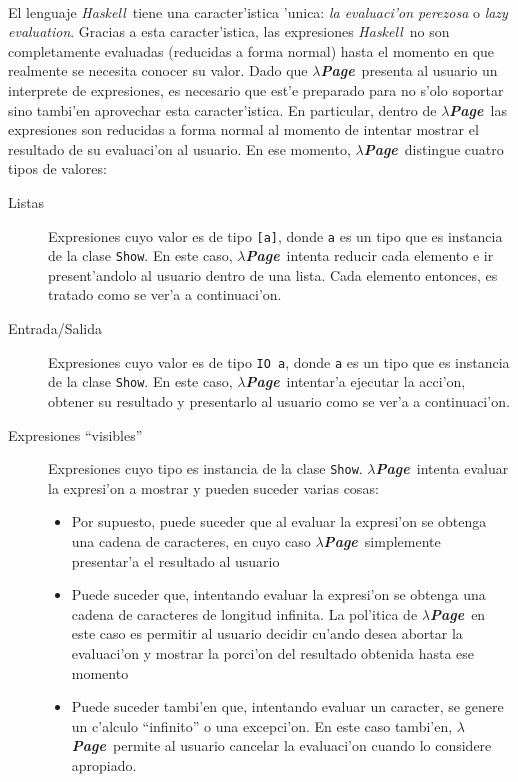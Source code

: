\documentclass[a4paper]{article}
\newcommand{\haskell}{\textsl{Haskell}}
\newcommand{\hpage}{\textbf{\textsl{$\lambda$Page}}}
\begin{document}
\paragraph{}El lenguaje \haskell\ tiene una caracter'istica 'unica: \textsl{la evaluaci'on perezosa} o \textsl{lazy evaluation}.  Gracias a esta caracter'istica, las expresiones \haskell\ no son completamente evaluadas (reducidas a forma normal) hasta el momento en que realmente se necesita conocer su valor.  Dado que \hpage\ presenta al usuario un interprete de expresiones, es necesario que est'e preparado para no s'olo soportar sino tambi'en aprovechar esta caracter'istica.  En particular, dentro de \hpage\ las expresiones son reducidas a forma normal al momento de intentar mostrar el resultado de su evaluaci'on al usuario.  En ese momento, \hpage\ distingue cuatro tipos de valores:
\begin{description}
	\item[Listas] Expresiones cuyo valor es de tipo \texttt{[a]}, donde \texttt{a} es un tipo que es instancia de la clase \texttt{Show}.  En este caso, \hpage\ intenta reducir cada elemento e ir present'andolo al usuario dentro de una lista.  Cada elemento entonces, es tratado como se ver'a a continuaci'on.
	\item[Entrada/Salida] Expresiones cuyo valor es de tipo \texttt{IO a}, donde \texttt{a} es un tipo que es instancia de la clase \texttt{Show}.  En este caso, \hpage\ intentar'a ejecutar la acci'on, obtener su resultado y presentarlo al usuario como se ver'a a continuaci'on.
	\item[Expresiones ``visibles''] Expresiones cuyo tipo es instancia de la clase \texttt{Show}.  \hpage\ intenta evaluar la expresi'on a mostrar y pueden suceder varias cosas:
		\begin{itemize}
			\item Por supuesto, puede suceder que al evaluar la expresi'on se obtenga una cadena de caracteres, en cuyo caso \hpage\ simplemente presentar'a el resultado al usuario
			\item Puede suceder que, intentando evaluar la expresi'on se obtenga una cadena de caracteres de longitud infinita.  La pol'itica de \hpage\ en este caso es permitir al usuario decidir cu'ando desea abortar la evaluaci'on y mostrar la porci'on del resultado obtenida hasta ese momento
			\item Puede suceder tambi'en que, intentando evaluar un caracter, se genere un c'alculo ``infinito'' o una excepci'on.  En este caso tambi'en, \hpage\ permite al usuario cancelar la evaluaci'on cuando lo considere apropiado.

\end{itemize}
\end{description}
\end{document}
